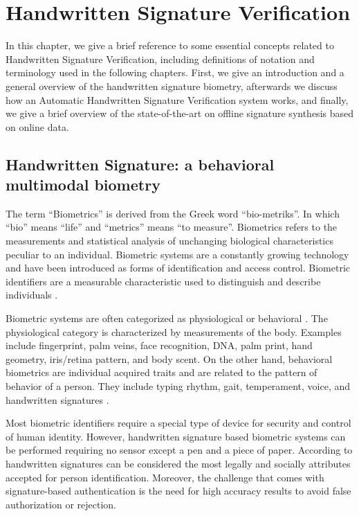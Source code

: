 
\chapter{Handwritten Signature Verification} \label{ch:sig}
In this chapter, we give a brief reference to some essential concepts related to Handwritten Signature Verification, including definitions of notation and terminology used in the following
chapters. First, we give an introduction and a general overview of the handwritten signature
biometry, afterwards we discuss how an Automatic Handwritten Signature Verification system
works, and finally, we give a brief overview of the state-of-the-art on offline signature synthesis
based on online data.

\section{Handwritten Signature: a behavioral multimodal biometry}

The term ``Biometrics'' is derived from the Greek word ``bio-metriks''. In which ``bio'' means ``life'' and ``metrics'' means ``to measure''. Biometrics refers to the measurements and statistical analysis of unchanging biological characteristics peculiar to an individual. Biometric systems are
a constantly growing technology \cite{jain2004biometrics} and have been introduced as forms of identification and access control. Biometric identifiers are a measurable characteristic used to distinguish and describe individuals \cite{jain2000biometric}. 

Biometric systems are often categorized as physiological or behavioral \cite{ross2008introduction}. The physiological category is characterized by measurements of the body. Examples include fingerprint, palm veins, face recognition, DNA, palm print, hand geometry, iris/retina pattern, and body scent. On the other hand, behavioral biometrics are individual acquired traits and are related to the pattern of behavior of a person. They include typing rhythm, gait, temperament, voice, and handwritten signatures \cite{jain2016}.

Most biometric identifiers require a special type of device for security and control of human identity. However, handwritten signature based biometric systems can be performed requiring no sensor except a pen and a piece of paper. According to \cite{pal2014signature} handwritten signatures can be considered the most legally and socially attributes accepted for person identification. Moreover, the challenge that comes with signature-based authentication is the need for high accuracy results to avoid false authorization or rejection.

